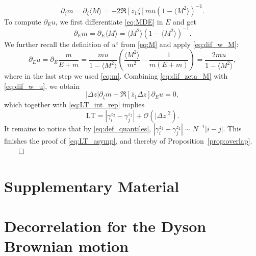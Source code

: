 \documentclass[10pt]{amsart}
\numberwithin{equation}{section}
\begin{document}
\begin{equation}
\partial_\zeta m = \partial_\zeta \langle M\rangle = -2\Re [\overline{z}_1\zeta]mu(1-\langle M^2\rangle)^{-1}.
\label{eq:dif_zeta_M}
\end{equation}
To compute $\partial_E u$, we first differentiate \eqref{eq:MDE} in $E$ and get
\begin{equation}
\partial_E m = \partial_E\langle M\rangle = \langle M^2\rangle(1-\langle M^2\rangle)^{-1}.
\label{eq:dif_w_M}
\end{equation}
We further recall the definition of $u^z$ from \eqref{eq:M} and apply \eqref{eq:dif_w_M}:
\begin{equation}
\partial_E u =\partial_E \frac{m}{E+m} = \frac{mu}{1-\langle M^2\rangle}\left(\frac{\langle M^2\rangle}{m^2}-\frac{1}{m(E+m)}\right) = \frac{2mu}{1-\langle M^2\rangle},
\label{eq:dif_w_u}
\end{equation}
where in the last step we used \eqref{eq:m}. Combining \eqref{eq:dif_zeta_M} with \eqref{eq:dif_w_u}, we obtain
\begin{equation}
|\Delta z|\partial_\zeta m + \Re \left[\overline{z}_1\Delta z\right] \partial_E u=0,
\end{equation}
which together with \eqref{eq:LT_int_rep} implies
\begin{equation}
\mathrm{LT}=|\gamma^{z_2}_i-\gamma^{z_2}_j|+\mathcal{O}(|\Delta z|^2).
\end{equation}
It remains to notice that by \eqref{eq:def_quantiles}, $|\gamma^{z_2}_i-\gamma^{z_2}_j|\sim N^{-1}|i-j|$. This finishes the proof of \eqref{eq:LT_asymp}, and thereby of Proposition~\ref{prop:overlap}.\hfill $\qed$


 


\clearpage

\section*{Supplementary Material}

\setcounter{section}{0}
\renewcommand{\thesection}{S\arabic{section}}
\renewcommand{\sectionname}{Section}

\section{Decorrelation for the Dyson Brownian motion}\label{sec:DBM}
\end{document}
